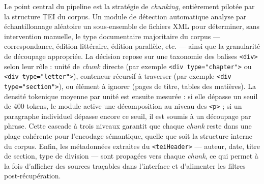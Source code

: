 \documentclass[final, fra]{anthology-ch}     %
\begin{document}
Le point central du pipeline est la stratégie de \textit{chunking}, entièrement pilotée par la structure TEI du corpus. Un module de détection automatique analyse par échantillonnage aléatoire un sous-ensemble de fichiers XML pour déterminer, sans intervention manuelle, le type documentaire majoritaire du corpus — correspondance, édition littéraire, édition parallèle, etc. — ainsi que la granularité de découpage appropriée. La décision repose sur une taxonomie des balises \texttt{<div>} selon leur rôle : unité de \textit{chunk} directe (par exemple \texttt{<div type="chapter">} ou \texttt{<div type="letter">}), conteneur récursif à traverser (par exemple \texttt{<div type="section">}), ou élément à ignorer (pages de titre, tables des matières). La densité tokenique moyenne par unité est ensuite mesurée : si elle dépasse un seuil de 400 tokens, le module active une décomposition au niveau des \texttt{<p>} ; si un paragraphe individuel dépasse encore ce seuil, il est soumis à un découpage par phrase. Cette cascade à trois niveaux garantit que chaque \textit{chunk} reste dans une plage cohérente pour l'encodage sémantique, quelle que soit la structure interne du corpus. Enfin, les métadonnées extraites du \texttt{<teiHeader>} — auteur, date, titre de section, type de division — sont propagées vers chaque \textit{chunk}, ce qui permet à la fois d'afficher des sources traçables dans l'interface et d'alimenter les filtres post-récupération.
\end{document}
